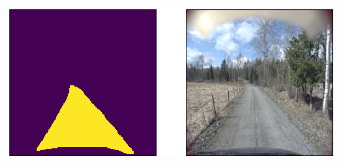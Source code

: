 \documentclass[USenglish]{ifimaster}  %
\begin{document}
\begin{appendices}
\begin{figure}[ht]
\begin{subfigure}[b]{\textwidth}
\end{subfigure}
\hfill
\begin{subfigure}[b]{\textwidth}
\centering
\includegraphics[width=0.95\textwidth]{bilder/appendix_2/385.png}
\end{subfigure}
\end{figure}


\end{appendices}
\end{document}
